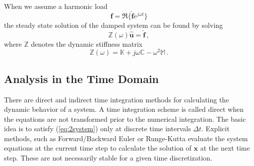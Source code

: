 \documentclass[conference]{journal}
\newcommand{\bb}[1]{\mathbb{#1}}
\newcommand{\B}[1]{\mathbf{#1}}
\newcommand{\Bx}{\B{x}}
\newcommand{\M}{\bb{M}}
\newcommand{\C}{\bb{C}}
\newcommand{\K}{\bb{K}}
\begin{document}
	When we assume a harmonic load
	\begin{equation}
	\B{f} = \Re\{ \hat{\B{f}} e^{j \omega t} \}
	\end{equation}
	the steady state solution of the damped system can be found by solving
	\begin{equation}
	\bb{Z}(\omega) \hat{\B{u}} = \hat{\B{f}}\,,
	\end{equation}
	where $\bb{Z}$ denotes the dynamic stiffness matrix
	\begin{equation}
	\bb{Z}(\omega) = \K + j\omega\C -\omega^2\M\,.
	\end{equation}

	



	\subsection{Analysis in the Time Domain}
	There are direct and indirect time integration methods for calculating the dynamic behavior of a system. A time integration scheme is called direct when the equations are not transformed prior to the numerical integration. The basic idea is to satisfy (\ref{eq:2system}) only at discrete time intervals $\Delta t$. Explicit methods, such as Forward/Backward Euler or Runge-Kutta evaluate the system equations at the current time step to calculate the solution of $\Bx$ at the next time step. These are not necessarily stable for a given time discretization.
\end{document}
